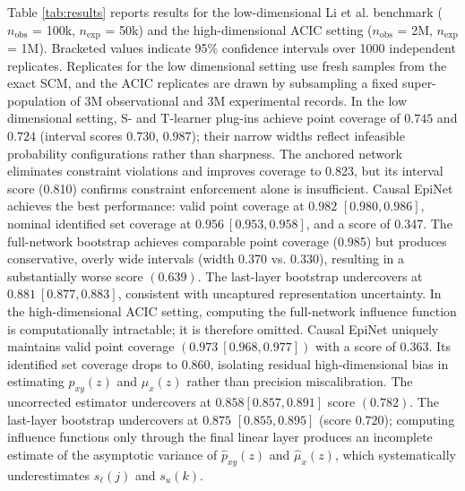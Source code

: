 \documentclass[accepted]{uai2026} %
\theoremstyle{plain}
\theoremstyle{definition}
\theoremstyle{remark}
\begin{document}
Table \ref{tab:results} reports results for the low-dimensional Li et al. benchmark ($n_\mathrm{obs}$ = 100k, $n_\mathrm{exp}$ = 50k) and the high-dimensional ACIC setting ($n_\mathrm{obs}$ = 2M, $n_\mathrm{exp}$ = 1M). Bracketed values indicate 95\% confidence intervals over 1000 independent replicates. Replicates for the low dimensional setting use fresh samples from the exact SCM, and the ACIC replicates are drawn by subsampling a fixed super-population of $3$M observational and $3$M experimental records. In the low dimensional setting, S- and T-learner plug-ins achieve point coverage of $0.745$ and $0.724$ (interval scores $0.730$, $0.987$); their narrow widths reflect infeasible probability configurations rather than sharpness. The anchored network eliminates constraint violations and improves coverage to 0.823, but its interval score (0.810) confirms constraint enforcement alone is insufficient. Causal EpiNet achieves the best performance: valid point coverage at $0.982$ $[0.980, 0.986]$, nominal identified set coverage at $0.956 \ [0.953, 0.958]$, and a score of 0.347. The full-network bootstrap achieves comparable point coverage (0.985) but produces conservative, overly wide intervals (width 0.370 vs. 0.330), resulting in a substantially worse score $(0.639)$. The last-layer bootstrap undercovers at $0.881 \  [0.877, 0.883]$, consistent with uncaptured representation uncertainty. In the high-dimensional ACIC setting, computing the full-network influence function is computationally intractable; it is therefore omitted. Causal EpiNet uniquely maintains valid point coverage $(0.973 \ [0.968, 0.977])$ with a score of $0.363$. Its identified set coverage drops to $0.860$, isolating residual high-dimensional bias in estimating $p_{xy}(z)$ and $\mu_x(z)$ rather than precision miscalibration. The uncorrected estimator undercovers at $0.858 [0.857, 0.891]$ score $(0.782)$. The last-layer bootstrap undercovers at $0.875$ $[0.855, 0.895]$ (score $0.720$); computing influence functions only through the final linear layer produces an incomplete estimate of the asymptotic variance of $\hat{p}_{xy}(z)$ and $\hat{\mu}_x(z)$, which systematically underestimates $s_\ell(j)$ and $s_u(k)$.
\end{document}
